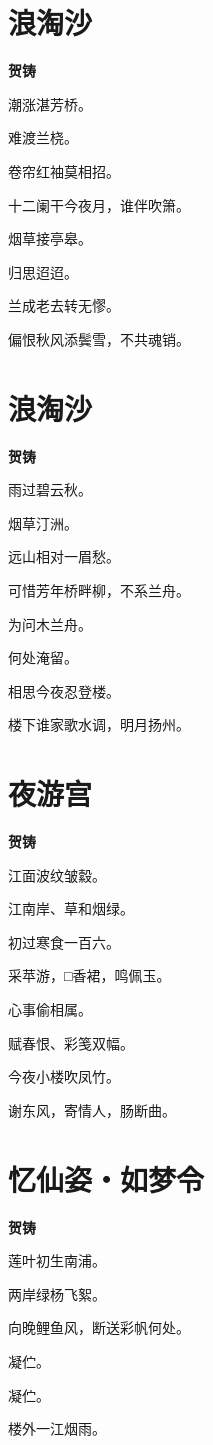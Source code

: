 \documentclass[12pt,a4paper]{ctexbook}
\begin{document}
\section{浪淘沙}
\textbf{贺铸}\par\vspace{0.5em}
潮涨湛芳桥。\par
难渡兰桡。\par
卷帘红袖莫相招。\par
十二阑干今夜月，谁伴吹箫。\par
烟草接亭皋。\par
归思迢迢。\par
兰成老去转无憀。\par
偏恨秋风添鬓雪，不共魂销。\par

\section{浪淘沙}
\textbf{贺铸}\par\vspace{0.5em}
雨过碧云秋。\par
烟草汀洲。\par
远山相对一眉愁。\par
可惜芳年桥畔柳，不系兰舟。\par
为问木兰舟。\par
何处淹留。\par
相思今夜忍登楼。\par
楼下谁家歌水调，明月扬州。\par

\section{夜游宫}
\textbf{贺铸}\par\vspace{0.5em}
江面波纹皱縠。\par
江南岸、草和烟绿。\par
初过寒食一百六。\par
采苹游，□香裙，鸣佩玉。\par
心事偷相属。\par
赋春恨、彩笺双幅。\par
今夜小楼吹凤竹。\par
谢东风，寄情人，肠断曲。\par

\section{忆仙姿・如梦令}
\textbf{贺铸}\par\vspace{0.5em}
莲叶初生南浦。\par
两岸绿杨飞絮。\par
向晚鲤鱼风，断送彩帆何处。\par
凝伫。\par
凝伫。\par
楼外一江烟雨。\par
\end{document}
